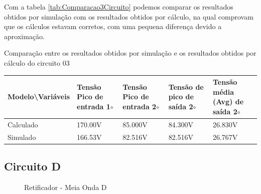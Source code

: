 Com a tabela \ref{tab:Comparacao3Circuito} podemos comparar os resultados obtidos por simulação com os resultados obtidos por cálculo, na qual comprovam que os cálculos estavam corretos, com uma pequena diferença devido a aproximação.

\begin{quadro}[H]
    \centering
    \caption{Comparação entre os resultados obtidos por simulação e os resultados obtidos por cálculo do circuito 03}
    \begin{tabular}{|C{0.19\textwidth}|C{0.18\textwidth}|C{0.18\textwidth}|C{0.18\textwidth}|C{0.18\textwidth}|}
        \hline
        \textbf{Modelo\textbackslash{}Variáveis} & \textbf{Tensão Pico de entrada 1$\circ$} & \textbf{Tensão Pico de entrada 2$\circ$} & \textbf{Tensão de pico de saída 2$\circ$} & \textbf{Tensão média (Avg) de saída 2$\circ$} \\
        \hline
        Calculado & 170.00V & 85.000V & 84.300V & 26.830V \\
        \hline
        Simulado & 166.53V & 82.516V & 82.516V & 26.767V \\
        \hline
    \end{tabular}
    \vspace{-0.6cm}
    \label{tab:Comparacao3Circuito}
\end{quadro}

\subsection{Circuito D}

\begin{figure}[H]
    \centering
    \caption{Retificador - Meia Onda D}
    \vspace{-0.3cm}
    \label{fig:ImagemSlide03}
\end{figure}

